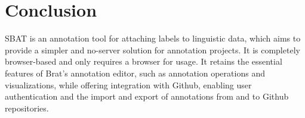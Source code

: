 \documentclass[12ptm a4paper]{article}
\begin{document}
\section{Conclusion}
SBAT is an annotation tool for attaching labels to linguistic data, which aims to provide a simpler and no-server solution for annotation projects. It is completely browser-based and only requires a browser for usage. It retains the essential features of Brat's annotation editor, such as annotation operations and visualizations, while offering integration with Github, enabling user authentication and the import and export of annotations from and to Github repositories.\\ 









\newpage


\end{document}

